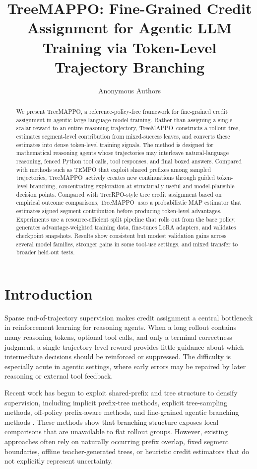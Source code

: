 \documentclass{article}
\title{TreeMAPPO: Fine-Grained Credit Assignment for Agentic LLM Training via Token-Level Trajectory Branching}
\author{Anonymous Authors}
\newcommand{\ours}{TreeMAPPO\xspace}
\begin{document}
\maketitle

\begin{abstract}
We present \ours, a reference-policy-free framework for fine-grained credit assignment in agentic large language model training. Rather than assigning a single scalar reward to an entire reasoning trajectory, \ours\ constructs a rollout tree, estimates segment-level contribution from mixed-success leaves, and converts these estimates into dense token-level training signals. The method is designed for mathematical reasoning agents whose trajectories may interleave natural-language reasoning, fenced Python tool calls, tool responses, and final boxed answers. Compared with methods such as TEMPO that exploit shared prefixes among sampled trajectories, \ours\ actively creates new continuations through guided token-level branching, concentrating exploration at structurally useful and model-plausible decision points. Compared with TreeRPO-style tree credit assignment based on empirical outcome comparisons, \ours\ uses a probabilistic MAP estimator that estimates signed segment contribution before producing token-level advantages. Experiments use a resource-efficient split pipeline that rolls out from the base policy, generates advantage-weighted training data, fine-tunes LoRA adapters, and validates checkpoint snapshots. Results show consistent but modest validation gains across several model families, stronger gains in some tool-use settings, and mixed transfer to broader held-out tests.
\end{abstract}

\section{Introduction}
Sparse end-of-trajectory supervision makes credit assignment a central bottleneck in reinforcement learning for reasoning agents. When a long rollout contains many reasoning tokens, optional tool calls, and only a terminal correctness judgment, a single trajectory-level reward provides little guidance about which intermediate decisions should be reinforced or suppressed. The difficulty is especially acute in agentic settings, where early errors may be repaired by later reasoning or external tool feedback.

Recent work has begun to exploit shared-prefix and tree structure to densify supervision, including implicit prefix-tree methods, explicit tree-sampling methods, off-policy prefix-aware methods, and fine-grained agentic branching methods \cite{tempo2025,treerpo2025,treepo2025,treeopo2025,appo2026}. These methods show that branching structure exposes local comparisons that are unavailable to flat rollout groups. However, existing approaches often rely on naturally occurring prefix overlap, fixed segment boundaries, offline teacher-generated trees, or heuristic credit estimators that do not explicitly represent uncertainty.
\end{document}
